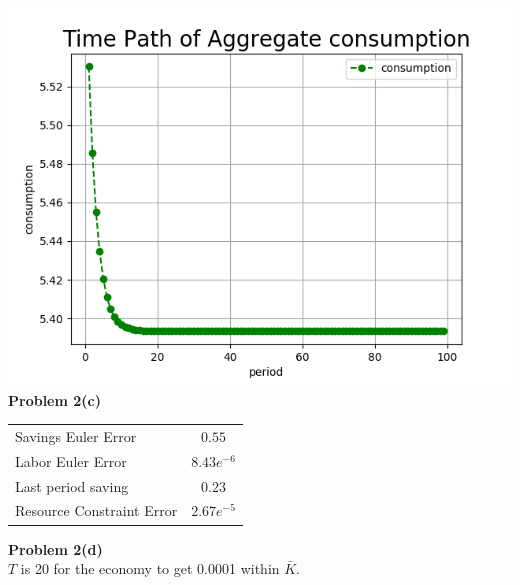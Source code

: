 \documentclass[letterpaper,12pt]{article}
\theoremstyle{definition}
\begin{document}
\includegraphics[scale=0.35]{images_TPI/tpi_C}
\\
\noindent\textbf{Problem 2(c)}\\
\begin{table}[htbp!]\centering
\begin{tabular}{|l|c|}\hline
 Savings Euler Error & $0.55$\\
 Labor Euler Error & $8.43e^{-6}$\\
 Last period saving & $0.23$\\
 Resource Constraint Error & $2.67e^{-5}$\\ \hline
\end{tabular}
\end{table}

\noindent\textbf{Problem 2(d)}\\
$T$ is 20 for the economy to get 0.0001 within $\bar{K}$.
\end{document}
